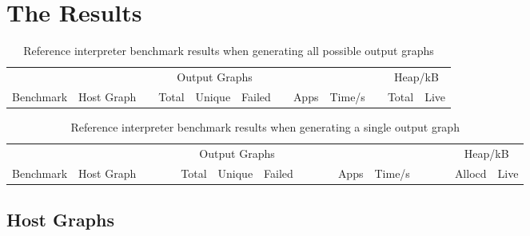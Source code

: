 \section{The Results}\label{the-results}



\begin{table}[h]
\begin{minipage}{\textwidth}
\centering

\begin{tabular}{llcrrrcrrcrr}
\hline 
&  && \multicolumn{3}{c}{Output Graphs} && & && \multicolumn{2}{c}{Heap/kB}\\
Benchmark          & Host Graph\footnotemark & & Total & Unique   & Failed & & Apps & Time/s   & & Total  & Live \\
\hline 

\end{tabular}

\caption[Reference interpreter benchmarks]{Reference interpreter benchmark results when generating all possible output graphs}

\label{table:resultsAll}
\end{minipage}
\end{table}




\begin{table}[h]
\begin{minipage}{\textwidth}
\centering

\begin{tabular}{llcrrrcrrcrr}
\hline 
&  &~~~~& \multicolumn{3}{c}{Output Graphs} &~~~~& & &~~~~& \multicolumn{2}{c}{Heap/kB}\\
Benchmark          & Host Graph\footnotemark & & Total & Unique   & Failed & & Apps & Time/s   & & Allocd & Live \\
\hline 

\end{tabular}

\caption[Reference interpreter benchmarks]{Reference interpreter benchmark results when generating a single output graph}

\label{table:resultsSingle}
\end{minipage}
\end{table}




\subsection{Host Graphs}
\label{subsec:hosts}

